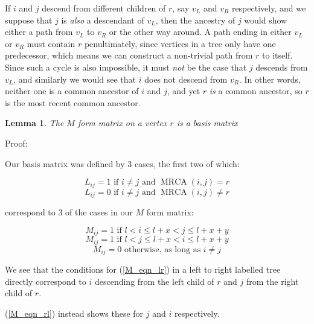 \documentclass[10pt,a4paper]{report}
\DeclareMathOperator{\MRCA}{MRCA}
\newtheorem{lemma}{Lemma}
\begin{document}
If $i$ and $j$ descend from different children of $r$, say $v_L$ and $v_R$ respectively, and we suppose that $j$ is \emph{also} a descendant of $v_L$, then the ancestry of $j$ would show either a path from $v_L$ to $v_R$ or the other way around.
A path ending in either $v_L$ or $v_R$ must contain $r$ penultimately, since vertices in a tree only have one predecessor, which means we can construct a non-trivial path from $r$ to itself.
Since such a cycle is also impossible, it must \emph{not} be the case that $j$ descends from $v_L$, and similarly we would see that $i$ does not descend from $v_R$.
In other words, neither one is a common ancestor of $i$ and $j$, and yet $r$ \emph{is} a common ancestor, so $r$ is the most recent common ancestor.

\begin{lemma} The $M$ form matrix on a vertex $r$ is a basis matrix
\end{lemma}

Proof:

Our basis matrix was defined by 3 cases, the first two of which:

\begin{equation} \label{L_eqn_yes}
	L_{ij} = 1 \textrm{ if } i \neq j \textrm{ and } \MRCA(i, j) = r
\end{equation}
\begin{equation} \label{L_eqn_no}
	L_{ij} = 0 \textrm{ if } i \neq j \textrm{ and } \MRCA(i, j) \neq r
\end{equation}

correspond to 3 of the cases in our $M$ form matrix:

\begin{equation} \label{M_eqn_lr}
	M_{ij} = 1 \textrm{ if } l < i \leq l + x < j \leq l + x + y
\end{equation}
\begin{equation} \label{M_eqn_rl}
	M_{ij} = 1 \textrm{ if } l < j \leq l + x < i \leq l + x + y
\end{equation}
\begin{equation} \label{M_eqn_no}
	M_{ij} = 0 \textrm{ otherwise, as long as } i \neq j
\end{equation}

We see that the conditions for (\ref{M_eqn_lr}) in a left to right labelled
tree directly correspond to $i$ descending from the left child of $r$ and $j$
from the right child of $r$.

(\ref{M_eqn_rl}) instead shows these for $j$ and $i$ respectively.
\end{document}
